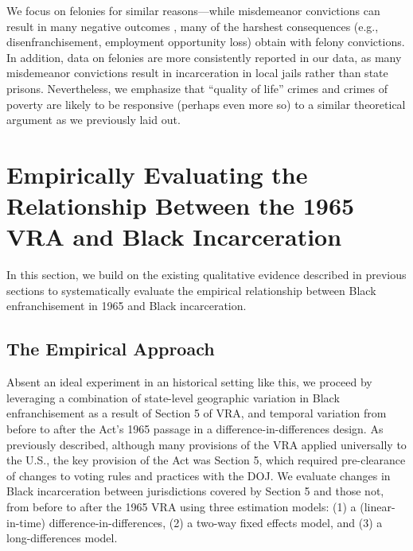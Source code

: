 \documentclass[12pt]{article}
\begin{document}
We focus on felonies for similar reasons---while misdemeanor convictions can result in many negative outcomes \citep{White:2019ks},  many of the harshest consequences (e.g., disenfranchisement, employment opportunity loss) obtain with felony convictions.  In addition, data on felonies are more consistently reported in our data, as many misdemeanor convictions result in incarceration in local jails rather than state prisons.  Nevertheless, we emphasize that ``quality of life'' crimes and crimes of poverty are likely to be responsive (perhaps even more so) to a similar theoretical argument as we previously laid out.











\section{Empirically Evaluating the Relationship Between the 1965 VRA and Black Incarceration}

In this section, we build on the existing qualitative evidence described in previous sections to systematically evaluate the empirical relationship between Black enfranchisement in 1965 and Black incarceration.


\subsection*{The Empirical Approach}

Absent an ideal experiment in an historical setting like this, we proceed by leveraging a combination of state-level geographic variation in Black enfranchisement as a result of Section 5 of VRA, and temporal variation from before to after the Act's 1965 passage in a difference-in-differences design.  As previously described, although many provisions of the VRA applied universally to the U.S., the key provision of the Act was Section 5, which required pre-clearance of changes to voting rules and practices with the DOJ.  We evaluate changes in Black incarceration between jurisdictions covered by Section 5 and those not, from before to after the 1965 VRA using three estimation models: (1) a (linear-in-time) difference-in-differences, (2) a two-way fixed effects model, and (3) a long-differences model.
\end{document}
